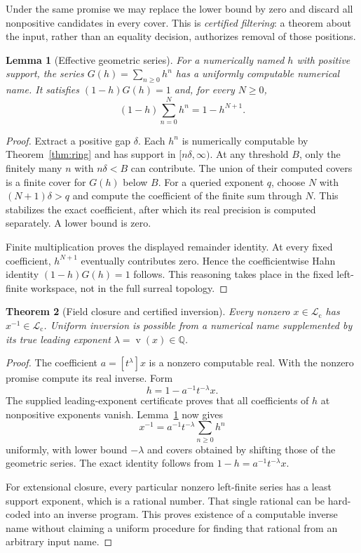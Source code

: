 \documentclass[11pt,letterpaper]{article}
\numberwithin{equation}{section}
\newtheorem{theorem}{Theorem}[section]
\newtheorem{lemma}[theorem]{Lemma}
\theoremstyle{definition}
\theoremstyle{remark}
\newcommand{\Lc}{\mathcal L_{\mathrm c}}
\newcommand{\Q}{\mathbb Q}
\newcommand{\val}{\operatorname{v}}
\newcommand{\coef}[2]{[t^{#1}]#2}
\begin{document}
Under the same promise we may replace the lower bound by zero and discard
all nonpositive candidates in every cover. This is \emph{certified
filtering}: a theorem about the input, rather than an equality decision,
authorizes removal of those positions.

\begin{lemma}[Effective geometric series]
\label{lem:geom}
For a numerically named $h$ with positive support, the series
$G(h)=\sum_{n\ge0}h^n$ has a uniformly computable numerical name. It satisfies
$(1-h)G(h)=1$ and, for every $N\ge0$,
\[
 (1-h)\sum_{n=0}^{N}h^n=1-h^{N+1}.
\]
\end{lemma}
\begin{proof}
Extract a positive gap $\delta$. Each $h^n$ is numerically computable by
Theorem~\ref{thm:ring} and has support in $[n\delta,\infty)$. At any
threshold $B$, only the finitely many $n$ with $n\delta<B$ can contribute.
The union of their computed covers is a finite cover for $G(h)$ below $B$.
For a queried exponent $q$, choose $N$ with $(N+1)\delta>q$ and compute
the coefficient of the finite sum through $N$. This stabilizes the exact
coefficient, after which its real precision is computed separately.
A lower bound is zero.

Finite multiplication proves the displayed remainder identity. At every
fixed coefficient, $h^{N+1}$ eventually contributes zero. Hence the
coefficientwise Hahn identity $(1-h)G(h)=1$ follows. This reasoning takes
place in the fixed left-finite workspace, not in the full surreal topology.
\end{proof}

\begin{theorem}[Field closure and certified inversion]
\label{thm:inverse}
Every nonzero $x\in\Lc$ has $x^{-1}\in\Lc$. Uniform inversion is possible
from a numerical name supplemented by its true leading exponent
$\lambda=\val(x)\in\Q$.
\end{theorem}
\begin{proof}
The coefficient $a=\coef\lambda x$ is a nonzero computable real. With the
nonzero promise compute its real inverse. Form
\[
 h=1-a^{-1}t^{-\lambda}x.
\]
The supplied leading-exponent certificate proves that all coefficients of
$h$ at nonpositive exponents vanish. Lemma~\ref{lem:geom} now gives
\begin{equation}\label{eq:inverse}
 x^{-1}=a^{-1}t^{-\lambda}\sum_{n\ge0}h^n
\end{equation}
uniformly, with lower bound $-\lambda$ and covers obtained by shifting
those of the geometric series. The exact identity follows from
$1-h=a^{-1}t^{-\lambda}x$.

For extensional closure, every particular nonzero left-finite series has a
least support exponent, which is a rational number. That single rational
can be hard-coded into an inverse program. This proves existence of a
computable inverse name without claiming a uniform procedure for finding
that rational from an arbitrary input name.
\end{proof}
\end{document}
